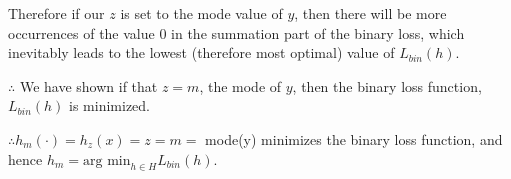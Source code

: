 Therefore if our $z$ is set to the mode value of $y$, then there will be more occurrences of the value 0 in the summation part of the binary loss, which inevitably leads to the lowest (therefore most optimal) value of $L_{bin}(h)$.

$\therefore$ We have shown if that $z = m$, the mode of $y$, then the binary loss function, $L_{bin}(h)$ is minimized.

$\therefore h_m(\cdot) = h_z(x) = z = m =$ mode(y) minimizes the binary loss function, and hence $h_m = \text{arg min}_{h \in H} L_{bin}(h)$.